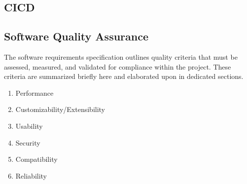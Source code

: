 \documentclass[11pt,a4paper]{article}
\begin{document}
\subsection*{CICD}




\subsection*{Software Quality Assurance}

The software requirements specification outlines quality criteria that must be assessed, measured, and validated for compliance within the project. 
These criteria are summarized briefly here and elaborated upon in dedicated sections.

\begin{enumerate}[label*=\arabic*.]
  \item Performance
  \item Customizability/Extensibility
  \item Usability
  \item Security
  \item Compatibility
  \item Reliability
\end{enumerate}
\end{document}
